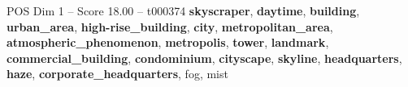 \begin{textsample}{POS Dim 1 – Score 18.00 – t000374}  \label{ex:f1_pos_033}
\textbf{skyscraper}, \textbf{daytime}, \textbf{building}, \textbf{urban\_area}, \textbf{high-rise\_building}, \textbf{city}, \textbf{metropolitan\_area}, \textbf{atmospheric\_phenomenon}, \textbf{metropolis}, \textbf{tower}, \textbf{landmark}, \textbf{commercial\_building}, \textbf{condominium}, \textbf{cityscape}, \textbf{skyline}, \textbf{headquarters}, \textbf{haze}, \textbf{corporate\_headquarters}, fog, mist

\end{textsample}
